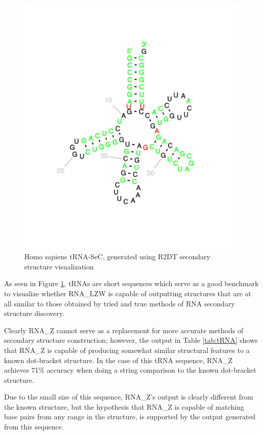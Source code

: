 \documentclass[sigconf]{acmart}
\begin{document}
\begin{figure}
  \includegraphics[width=\linewidth]{for_paper1.png}
  \caption{Homo sapiens tRNA-SeC, generated using R2DT secondary structure visualization}
  \label{fig:tRNA}
\end{figure}

As seen in Figure \ref{fig:tRNA},  tRNAs are short sequences which serve as a good benchmark to visualize whether RNA\_LZW is capable of outputting structures that are at all similar to those obtained by tried and true methods of RNA secondary structure discovery. 

Clearly RNA\_Z cannot serve as a replacement for more accurate methods of secondary structure construction; however, the output in Table \ref{tab:tRNA} shows that RNA\_Z is capable of producing somewhat similar structural features to a known dot-bracket structure.  In the case of this tRNA sequence,  RNA\_Z achieves 71\% accuracy when doing a string comparison to the known dot-bracket structure. 

Due to the small size of this sequence, RNA\_Z's output is clearly different from the known structure, but the hypothesis that RNA\_Z is capable of matching base pairs from any range in the structure, is supported by the output generated from this sequence. 
\end{document}
